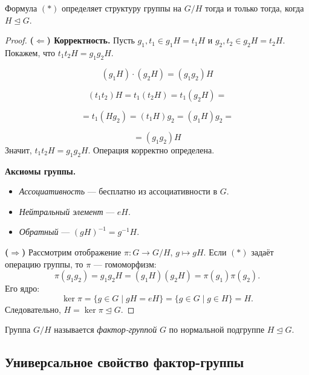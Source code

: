 \begin{stmt}
    Формула $(*)$ определяет структуру группы на $G/H$ тогда и только тогда, когда $H \trianglelefteq G$.

    \begin{proof}
        \textbf{($\Leftarrow$) Корректность.} Пусть $g_1, t_1 \in g_1 H = t_1 H$ и $g_2, t_2 \in g_2 H = t_2 H$.
        Покажем, что $t_1 t_2 H = g_1 g_2 H$.

        \[
        (g_1 H)\cdot(g_2 H) = (g_1 g_2)H
        \]

        \[
        (t_1 t_2)H = t_1(t_2 H) = t_1(g_2 H) =
        \]

        \[
        = t_1(H g_2) = (t_1 H) g_2 = (g_1 H) g_2 =
        \]

        \[
        = (g_1 g_2)H
        \]
        Значит, $t_1 t_2 H = g_1 g_2 H$. Операция корректно определена.

        \textbf{Аксиомы группы.}
        \begin{itemize}
            \item \emph{Ассоциативность} --- бесплатно из ассоциативности в $G$.
            \item \emph{Нейтральный элемент} --- $eH$.
            \item \emph{Обратный} --- $(gH)^{-1} = g^{-1}H$.
        \end{itemize}

        \textbf{($\Rightarrow$)} Рассмотрим отображение $\pi\colon G \to G/H$, $g \mapsto gH$. Если $(*)$ задаёт операцию группы,
        то $\pi$ --- гомоморфизм:
        \[
            \pi(g_1 g_2) = g_1 g_2 H = (g_1 H)(g_2 H) = \pi(g_1)\pi(g_2).
        \]
        Его ядро:
        \[
            \ker \pi = \{g \in G \mid gH = eH\} = \{g \in G \mid g \in H\} = H.
        \]
        Следовательно, $H = \ker \pi \trianglelefteq G$.
    \end{proof}
\end{stmt}

\begin{definition}
    Группа $G/H$ называется \emph{фактор-группой} $G$ по нормальной подгруппе $H \trianglelefteq G$.
\end{definition}

\subsection*{Универсальное свойство фактор-группы}

